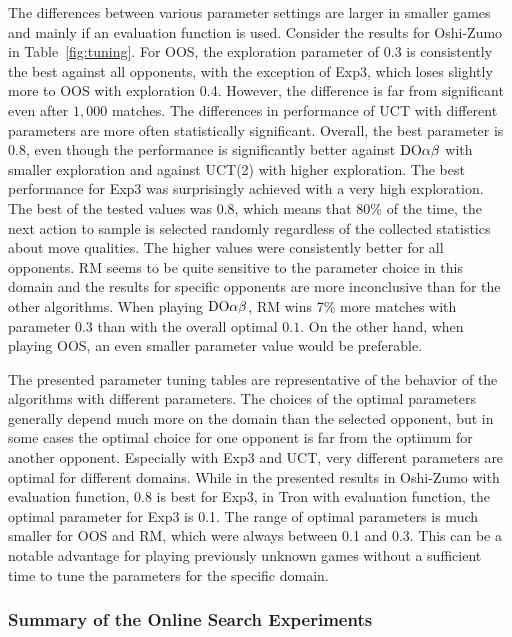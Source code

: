 {The differences between various parameter settings are larger in smaller games and mainly if an evaluation function is used.
Consider the results for Oshi-Zumo in Table~\ref{fig:tuning}.
For OOS, the exploration parameter of $0.3$ is consistently the best against all opponents, with the exception of Exp3, which loses slightly more to OOS with exploration 0.4.
However, the difference is far from significant even after $1,000$ matches.
The differences in performance of UCT with different parameters are more often statistically significant.
Overall, the best parameter is 0.8, even though the performance is significantly better against $\textrm{DO}\alpha\beta$ with smaller exploration and against UCT(2) with higher exploration.
The best performance for Exp3 was surprisingly achieved with a very high exploration. The best of the tested values was 0.8, which means that 80\% of the time, the next action to sample is selected randomly regardless of the collected statistics about move qualities.
The higher values were consistently better for all opponents.
RM seems to be quite sensitive to the parameter choice in this domain and the results for specific opponents are more inconclusive than for the other algorithms.
When playing $\textrm{DO}\alpha\beta$, RM wins 7\% more  matches with parameter $0.3$ than with the overall optimal $0.1$.
On the other hand, when playing OOS, an even smaller parameter value would be preferable.

The presented parameter tuning tables are representative of the behavior of the algorithms with different parameters. The choices of the optimal parameters generally depend much more on the domain than the selected opponent, but in some cases the optimal choice for one opponent is far from the optimum for another opponent.  Especially with Exp3 and UCT, very different parameters are optimal for different domains.
While in the presented results in Oshi-Zumo with evaluation function, 0.8 is best for Exp3, in Tron with evaluation function, the optimal parameter for Exp3 is 0.1.
The range of optimal parameters is much smaller for OOS and RM, which were always between 0.1 and 0.3. This can be a notable advantage for playing previously unknown games without a sufficient time to tune the parameters for the specific domain.
}

\subsubsection{Summary of the Online Search Experiments}

